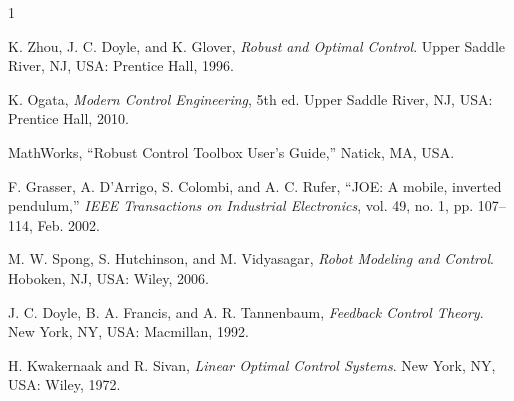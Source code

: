 \documentclass[conference]{IEEEtran}
\begin{document}
\begin{thebibliography}{1}

K. Zhou, J. C. Doyle, and K. Glover, \emph{Robust and Optimal Control}. Upper Saddle River, NJ, USA: Prentice Hall, 1996.

K. Ogata, \emph{Modern Control Engineering}, 5th ed. Upper Saddle River, NJ, USA: Prentice Hall, 2010.

MathWorks, ``Robust Control Toolbox User's Guide,'' Natick, MA, USA.

F. Grasser, A. D'Arrigo, S. Colombi, and A. C. Rufer, ``JOE: A mobile, inverted pendulum,'' \emph{IEEE Transactions on Industrial Electronics}, vol. 49, no. 1, pp. 107--114, Feb. 2002.

M. W. Spong, S. Hutchinson, and M. Vidyasagar, \emph{Robot Modeling and Control}. Hoboken, NJ, USA: Wiley, 2006.

J. C. Doyle, B. A. Francis, and A. R. Tannenbaum, \emph{Feedback Control Theory}. New York, NY, USA: Macmillan, 1992.

H. Kwakernaak and R. Sivan, \emph{Linear Optimal Control Systems}. New York, NY, USA: Wiley, 1972.

\end{thebibliography}
\end{document}

